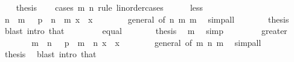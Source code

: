 \begin{isabellebody}
\isanewline
\ \ \isamarkupfalse%
\ thesis\isanewline
\ \ \isamarkupfalse%
\ {\isacharparenleft}{\kern0pt}cases\ m\ n\ rule{\isacharcolon}{\kern0pt}\ linorder{\isacharunderscore}{\kern0pt}cases{\isacharparenright}{\kern0pt}\isanewline
\ \ \ \ \isamarkupfalse%
\ less\isanewline
\ \ \ \ \isamarkupfalse%
\ \isamarkupfalse%
\ {\isacartoucheopen}n\ {\isacharminus}{\kern0pt}\ m\ {\isachargreater}{\kern0pt}\ {}{\isacartoucheclose}\ {\isacartoucheopen}{\isacharparenleft}{\kern0pt}p\ {\isacharcircum}{\kern0pt}{\isacharcircum}{\kern0pt}\ {\isacharparenleft}{\kern0pt}n\ {\isacharminus}{\kern0pt}\ m{\isacharparenright}{\kern0pt}{\isacharparenright}{\kern0pt}\ x\ {\isacharequal}{\kern0pt}\ x{\isacartoucheclose}\isanewline
\ \ \ \ \ \ \isamarkupfalse%
\ general\ {\isacharbrackleft}{\kern0pt}of\ n\ m{\isacharbrackright}{\kern0pt}\ m\ \isamarkupfalse%
\ simp{\isacharunderscore}{\kern0pt}all\isanewline
\ \ \ \ \isamarkupfalse%
\ \isamarkupfalse%
\ thesis\ \isamarkupfalse%
\ {\isacharparenleft}{\kern0pt}blast\ intro{\isacharcolon}{\kern0pt}\ that{\isacharparenright}{\kern0pt}\isanewline
\ \ \isamarkupfalse%
\isanewline
\ \ \ \ \isamarkupfalse%
\ equal\isanewline
\ \ \ \ \isamarkupfalse%
\ \isamarkupfalse%
\ thesis\ \isamarkupfalse%
\ m\ \isamarkupfalse%
\ simp\isanewline
\ \ \isamarkupfalse%
\isanewline
\ \ \ \ \isamarkupfalse%
\ greater\isanewline
\ \ \ \ \isamarkupfalse%
\ \isamarkupfalse%
\ {\isacartoucheopen}m\ {\isacharminus}{\kern0pt}\ n\ {\isachargreater}{\kern0pt}\ {}{\isacartoucheclose}\ {\isacartoucheopen}{\isacharparenleft}{\kern0pt}p\ {\isacharcircum}{\kern0pt}{\isacharcircum}{\kern0pt}\ {\isacharparenleft}{\kern0pt}m\ {\isacharminus}{\kern0pt}\ n{\isacharparenright}{\kern0pt}{\isacharparenright}{\kern0pt}\ x\ {\isacharequal}{\kern0pt}\ x{\isacartoucheclose}\isanewline
\ \ \ \ \ \ \isamarkupfalse%
\ general\ {\isacharbrackleft}{\kern0pt}of\ m\ n{\isacharbrackright}{\kern0pt}\ m\ \isamarkupfalse%
\ simp{\isacharunderscore}{\kern0pt}all\isanewline
\ \ \ \ \isamarkupfalse%
\ \isamarkupfalse%
\ thesis\ \isamarkupfalse%
\ {\isacharparenleft}{\kern0pt}blast\ intro{\isacharcolon}{\kern0pt}\ that{\isacharparenright}{\kern0pt}\isanewline

\end{isabellebody}
